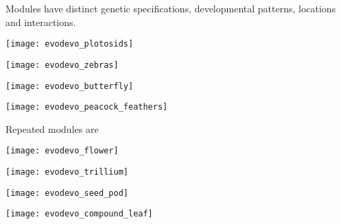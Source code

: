 \documentclass[t,handout]{beamer}  %
\begin{document}
\begin{frame}{Modules have distinct genetic specifications, developmental patterns, locations and interactions.}
\vspace{-\baselineskip}

\begin{multicols}{2}

\centering

\texttt{[image: evodevo\_plotosids]}

\vspace{0.5ex}

\noindent\texttt{[image: evodevo\_zebras]}

\columnbreak

\texttt{[image: evodevo\_butterfly]}

\vspace{0.5ex}

\texttt{[image: evodevo\_peacock\_feathers]}

\end{multicols}
	
\end{frame}


\begin{frame}{Repeated modules are }

\vspace{-\baselineskip}

\begin{multicols}{2}

\centering

\texttt{[image: evodevo\_flower]}

\vspace{0.5ex}

\noindent\texttt{[image: evodevo\_trillium]}

\columnbreak

\texttt{[image: evodevo\_seed\_pod]}

\vspace{0.5ex}

\texttt{[image: evodevo\_compound\_leaf]}

\end{multicols}
	
\end{frame}

\end{document}
